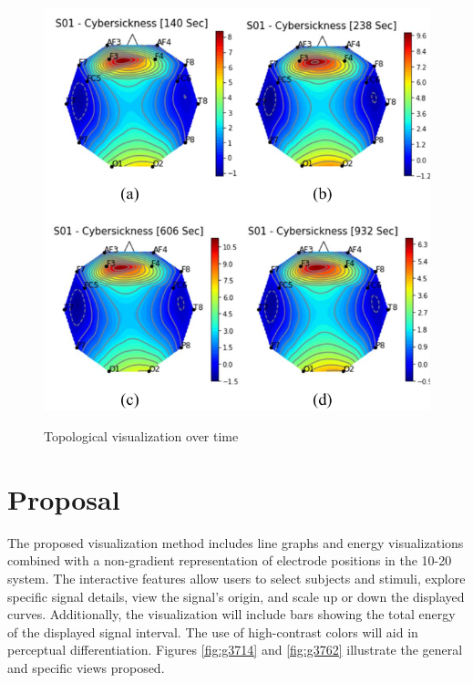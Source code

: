 \documentclass[format=sigconf]{acmart}
\begin{document}
			\begin{figure}[h]
				\centering
				\caption{Topological visualization over time}
				\includegraphics[width=\linewidth]{../presentation/images/visu02}
				\label{fig:visu02}
			\end{figure}
	
	\section{Proposal}
		\par The proposed visualization method includes line graphs and energy visualizations combined with a non-gradient representation of electrode positions in the 10-20 system. The interactive features allow users to select subjects and stimuli, explore specific signal details, view the signal's origin, and scale up or down the displayed curves. Additionally, the visualization will include bars showing the total energy of the displayed signal interval. The use of high-contrast colors will aid in perceptual differentiation. Figures \ref{fig:g3714} and \ref{fig:g3762} illustrate the general and specific views proposed.
	
\end{document}
